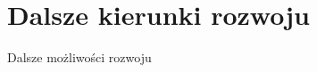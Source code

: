 \section{Dalsze kierunki rozwoju}\label{sec:dalsze-kierunki-rozwoju}

\begin{frame}{Dalsze możliwości rozwoju}

    \begin{alertblock}
    \end{alertblock}
\end{frame}